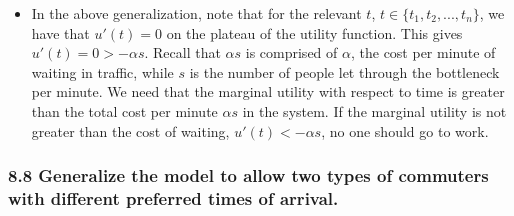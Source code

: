 \documentclass[]{article}
\providecommand{\tightlist}{%
  \setlength{\itemsep}{0pt}\setlength{\parskip}{0pt}}
\begin{document}
\begin{itemize}
\tightlist
\item
  In the above generalization, note that for the relevant \(t\),
  \(t \in \{t_1,t_2,...,t_n\}\), we have that \(u'(t) = 0\) on the
  plateau of the utility function. This gives \(u'(t)=0>-\alpha s\).
  Recall that \(\alpha s\) is comprised of \(\alpha\), the cost per
  minute of waiting in traffic, while \(s\) is the number of people let
  through the bottleneck per minute. We need that the marginal utility
  with respect to time is greater than the total cost per minute
  \(\alpha s\) in the system. If the marginal utility is not greater
  than the cost of waiting, \(u'(t)< - \alpha s\), no one should go to
  work.
\end{itemize}

\subsubsection{8.8 Generalize the model to allow two types of commuters
with different preferred times of
arrival.}\label{generalize-the-model-to-allow-two-types-of-commuters-with-different-preferred-times-of-arrival.}
\end{document}
